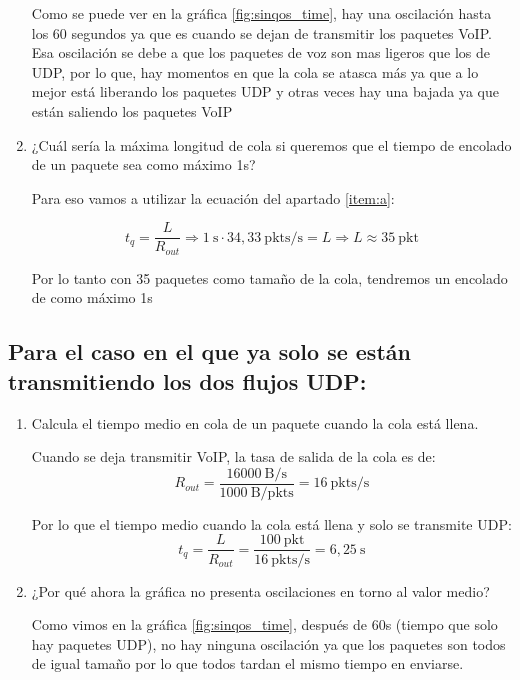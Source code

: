\begin{enumerate}
    Como se puede ver en la gráfica \ref{fig:sinqos_time}, hay una oscilación hasta los 60 segundos ya que es cuando se dejan de transmitir los paquetes VoIP. Esa oscilación
    se debe a que los paquetes de voz son mas ligeros que los de UDP, por lo que, hay momentos en que la cola se atasca más ya que a lo
    mejor está liberando los paquetes UDP y otras veces hay una bajada ya que están saliendo los paquetes VoIP
    
    \item ¿Cuál sería la máxima longitud de cola si queremos que el tiempo de encolado de un paquete sea como máximo 1s? \label{item:c}
    
    Para eso vamos a utilizar la ecuación del apartado \ref{item:a}:

    \[
      t_{q} =  \frac{L}{R_{out}} \Rightarrow 1~\mathrm{s} \cdot 34,33~\mathrm{pkts/s} = L \Rightarrow L \approx 35~\mathrm{pkt}
    \]

    Por lo tanto con 35 paquetes como tamaño de la cola, tendremos un encolado de como máximo 1s


\end{enumerate}

\subsection{Para el caso en el que ya solo se están transmitiendo los dos flujos UDP:}
\begin{enumerate}
    
    \item Calcula el tiempo medio en cola de un paquete cuando la cola está llena.
    
    Cuando se deja transmitir VoIP, la tasa de salida de la cola es de:
    \[
      R_{out} = \frac{16000~\text{B/s}}{1000~\text{B/pkts}} = 16~\text{pkts/s}
    \]

    Por lo que el tiempo medio cuando la cola está llena y solo se transmite UDP:
    \[
      t_{q} = \frac{L}{R_{out}} = \frac{100~\mathrm{pkt}}{16~\mathrm{pkts/s}} = 6,25~\mathrm{s}
    \]

    \item ¿Por qué ahora la gráfica no presenta oscilaciones en torno al valor medio?
    
    Como vimos en la gráfica \ref{fig:sinqos_time}, después de 60s (tiempo que solo hay paquetes UDP), no hay ninguna oscilación
    ya que los paquetes son todos de igual tamaño por lo que todos tardan el mismo tiempo en enviarse.
  

\end{enumerate}


